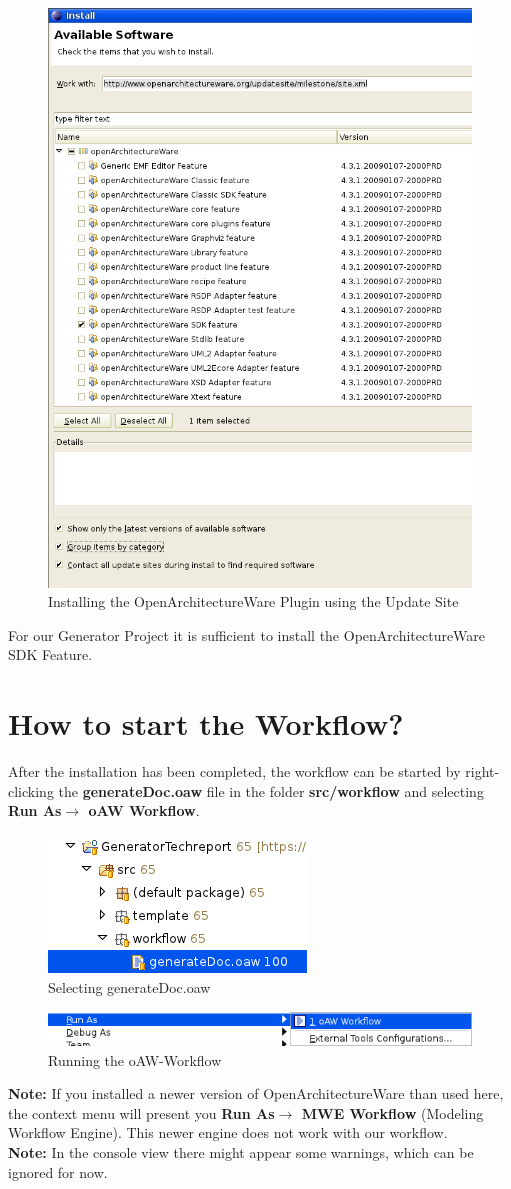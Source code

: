 \begin{figure}[htbp]
  \centering
  \includegraphics[width=0.5\linewidth]{figures/OAW-UpdateSite}
  \caption{Installing the OpenArchitectureWare Plugin using the Update Site}
\end{figure}

For our Generator Project it is sufficient to install the OpenArchitectureWare
SDK Feature.

\section{How to start the Workflow?}
After the installation has been completed, the workflow can be started by
right-clicking the \textbf{generateDoc.oaw} file in the folder
\textbf{src/workflow} and selecting \textbf{Run As$\to$ oAW Workflow}.

\begin{figure}[htbp]
  \centering
  \includegraphics[width=0.5\linewidth]{figures/OAW-WorkflowFile}
  \caption{Selecting generateDoc.oaw}
\end{figure}

\begin{figure}[htbp]
  \centering
  \includegraphics[width=1\linewidth]{figures/OAW-RunAs}
  \caption{Running the oAW-Workflow}
\end{figure}

\textbf{Note:} If you installed a newer version of OpenArchitectureWare than
used here, the context menu will present you \textbf{Run As$\to$ MWE
Workflow} (Modeling Workflow Engine). This newer engine does not work with our
workflow.\\

\textbf{Note:} In the console view there might appear some warnings, which can
be ignored for now.